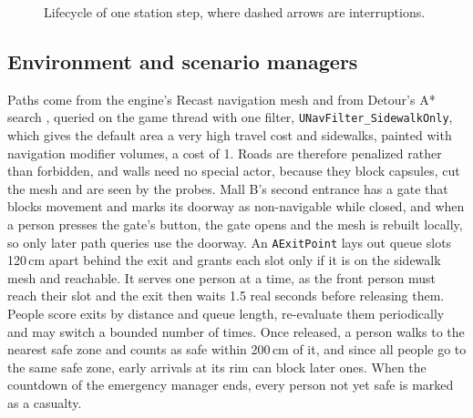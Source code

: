\begin{figure}[H]
\caption[Lifecycle of one station step]{Lifecycle of one station step, where dashed arrows are interruptions.}
\label{fig:station-lifecycle}
\end{figure}

\subsection{Environment and scenario managers}
\label{sec:environment}\label{sec:scenario-managers}

Paths come from the engine's Recast navigation mesh and from Detour's A* search \citep{snook2000simplified,mononen2009recast,hart1968formal,epicgames2026navigation}, queried on the game thread with one filter, \texttt{UNavFilter\_SidewalkOnly}, which gives the default area a very high travel cost and sidewalks, painted with navigation modifier volumes, a cost of 1. Roads are therefore penalized rather than forbidden, and walls need no special actor, because they block capsules, cut the mesh and are seen by the probes. Mall B's second entrance has a gate that blocks movement and marks its doorway as \mbox{non-navigable} while closed, and when a person presses the gate's button, the gate opens and the mesh is rebuilt locally, so only later path queries use the doorway. An \texttt{AExitPoint} lays out queue slots 120\,cm apart behind the exit and grants each slot only if it is on the sidewalk mesh and reachable. It serves one person at a time, as the front person must reach their slot and the exit then waits 1.5 real seconds before releasing them. People score exits by distance and queue length, re-evaluate them periodically and may switch a bounded number of times. Once released, a person walks to the nearest safe zone and counts as safe within 200\,cm of it, and since all people go to the same safe zone, early arrivals at its rim can block later ones. When the countdown of the emergency manager ends, every person not yet safe is marked as a casualty.

